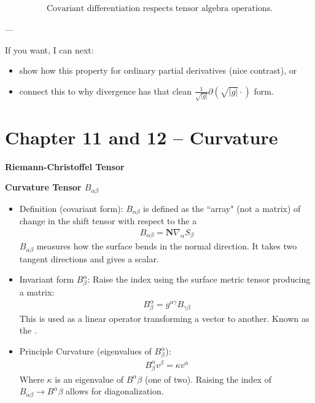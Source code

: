 \documentclass[12pt,a4paper]{report}
\begin{document}
\begin{description}
\begin{description}
\begin{align*}
\boxed{
\text{Covariant differentiation respects tensor algebra operations.}
}
\end{align*}

---
\end{description}

If you want, I can next:

\begin{itemize}
\item show how this property  for ordinary partial derivatives (nice contrast), or
\item connect this to why divergence has that clean $\frac{1}{\sqrt{|g|}}\partial(\sqrt{|g|}\cdot)$ form.
\end{itemize}


\newpage
\section*{Chapter 11 and 12 -- Curvature}

\item \textbf{Riemann-Christoffel Tensor}

\item \textbf{Curvature Tensor $B_{\alpha\beta}$ }

\begin{itemize}
	\item Definition (covariant form): $B_{\alpha\beta}$ is defined as the ``array" (not a matrix) of change in the shift tensor with respect to the a
		\begin{align*}
			B_{\alpha\beta} = \textbf{N} \nabla_\alpha S_{ \beta}
		\end{align*}
		$B_{\alpha\beta}$ measures how the surface bends in the normal direction.  It takes two tangent directions and gives a scalar.

	\item Invariant form $B^\alpha_\beta$: Raise the index using the surface metric tensor producing a matrix:
		\begin{align*}
			B^\alpha_{\beta} = g^{\alpha\gamma} B_{\gamma\beta}
		\end{align*}
		This is used as a linear operator transforming a vector to another.  Known as the .

	\item Principle Curvature (eigenvalues of $B^\alpha_\beta$):
	\begin{align*}
		B^\alpha_\beta v^\beta = \kappa v^\alpha
	\end{align*}Where $\kappa$ is an eigenvalue of $B^\alpha\beta$ (one of two).  Raising the index of $B_{\alpha\beta} \to B^\alpha\beta$ allows for diagonalization.


\end{itemize}
\end{description}
\end{document}
